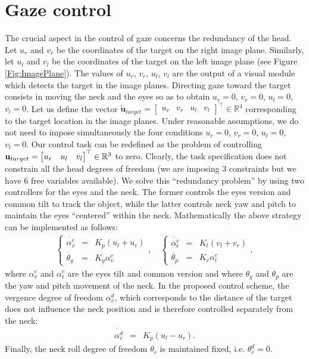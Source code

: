 \section{Gaze control}
\label{Sec:gazecontrol}

%
% 
The crucial aspect in the control of gaze concerns the redundancy of the 
head. Let $u_r$ and $v_r$ be the coordinates of the target on the 
right image plane. Similarly, let $u_l$ and $v_l$ be the coordinates 
of the target on the 
left image plane (see Figure \ref{Fig:ImagePlane}). The values of $u_r$, 
$v_r$, $u_l$, $v_l$ are the output of a visual module which detects the
target in the image planes. Directing gaze 
toward the target 
consists in moving the neck and the eyes so as to obtain 
$u_r=0$, $v_r=0$, $u_l=0$, $v_l=0$. 
Let us define the vector 
$\tilde {\mathbf u}_{target}= \begin{bmatrix} u_r & v_r & u_l & v_l 
\end{bmatrix}^\top \in \mathbb R^4$ corresponding to the 
target location in the image planes. Under reasonable 
assumptions, we do not need to impose simultaneously 
the four conditions $u_r=0$, $v_r=0$, $u_l=0$, $v_l=0$.  Our control task 
can be redefined as the problem of controlling 
$\mathbf{u}_{target} = \begin{bmatrix} u_r & u_l & v_l \end{bmatrix}^\top \in \mathbb R^3$ 
to zero. Clearly, the task specification does not constrain all the head 
degrees of freedom (we are imposing $3$ constraints but we 
have $6$ free variables available). 
We solve this ``redundancy problem'' by using two controllers for the 
eyes and the neck. The former controls 
the eyes version and common tilt to track the object, while the latter
controls neck yaw and pitch to maintain the eyes ``centered'' within 
the neck. Mathematically the above strategy can be implemented 
as follows:
%
\begin{eqnarray} \label{Eq:HeadEyeControl}
\left\{\begin{matrix}
\dot {\alpha_v^c} &=&   K_p (u_l + u_r)\\
\dot {\theta_y} &=&   K_y \alpha_v^c 
\end{matrix}
\right.,\quad
\left\{ \begin{matrix}
\dot {\alpha_t^c} &=&   K_t (v_l + v_r)\\
\dot {\theta_p} &=&   K_r \alpha_t^c
\end{matrix} \right.,
\end{eqnarray}
%
where $\alpha_v^c$ and $\alpha_t^c$ are the eyes tilt and common version and 
where $\theta_y$ and $\theta_p$ are the yaw and pitch movement of the neck. 
In the proposed control scheme, the vergence degree of freedom $\alpha_v^d$, 
which corresponds to the distance of the target does not influence 
the neck position and is therefore controlled separately from the neck:
\begin{eqnarray} 
\dot {\alpha_v^d} &=&   K_p (u_l - u_r).
\end{eqnarray}
Finally, the neck roll degree of freedom $\theta_r$ is maintained fixed, 
i.e. $\theta_r^d=0$.

